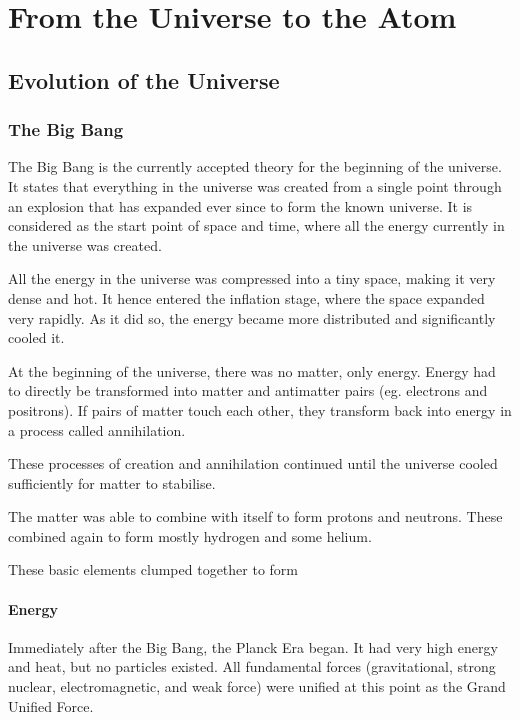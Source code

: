 
\chapter{From the Universe to the Atom}

\section{Evolution of the Universe}

	\subsection{The Big Bang}
	
		The Big Bang is the currently accepted theory for the beginning of the universe. It states that everything in the universe was created from a single point through an explosion that has expanded ever since to form the known universe. It is considered as the start point of space and time, where all the energy currently in the universe was created.

		All the energy in the universe was compressed into a tiny space, making it very dense and hot. It hence entered the inflation stage, where the space expanded very rapidly. As it did so, the energy became more distributed and significantly cooled it.

		At the beginning of the universe, there was no matter, only energy. Energy had to directly be transformed into matter and antimatter pairs (eg. electrons and positrons). If pairs of matter touch each other, they transform back into energy in a process called annihilation.

		These processes of creation and annihilation continued until the universe cooled sufficiently for matter to stabilise.

		The matter was able to combine with itself to form protons and neutrons. These combined again to form mostly hydrogen and some helium.

		These basic elements clumped together to form

		\subsubsection{Energy}

			Immediately after the Big Bang, the Planck Era began. It had very high energy and heat, but no particles existed. All fundamental forces (gravitational, strong nuclear, electromagnetic, and weak force) were unified at this point as the Grand Unified Force. 

